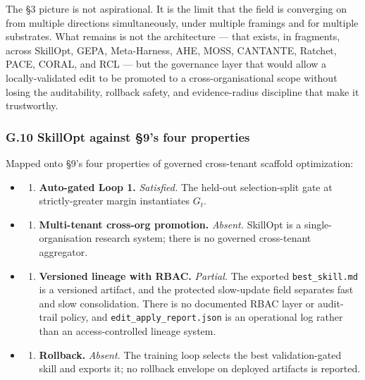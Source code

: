 The §3 picture is not aspirational. It is the limit that the field is
converging on from multiple directions simultaneously, under multiple
framings and for multiple substrates. What remains is not the
architecture --- that exists, in fragments, across SkillOpt, GEPA,
Meta-Harness, AHE, MOSS, CANTANTE, Ratchet, PACE, CORAL, and RCL --- but
the governance layer that would allow a locally-validated edit to be
promoted to a cross-organisational scope without losing the
auditability, rollback safety, and evidence-radius discipline that make
it trustworthy.

\subsubsection{G.10 SkillOpt against §9's four
properties}\label{g.10-skillopt-against-9s-four-properties}

Mapped onto §9's four properties of governed cross-tenant scaffold
optimization:

\begin{itemize}
\tightlist
\item
  \begin{enumerate}
  \def\labelenumi{(\alph{enumi})}
  \tightlist
  \item
    \textbf{Auto-gated Loop 1.} \emph{Satisfied.} The held-out
    selection-split gate at strictly-greater margin instantiates
    \(G_t\).
  \end{enumerate}
\item
  \begin{enumerate}
  \def\labelenumi{(\alph{enumi})}
  \setcounter{enumi}{1}
  \tightlist
  \item
    \textbf{Multi-tenant cross-org promotion.} \emph{Absent.} SkillOpt
    is a single-organisation research system; there is no governed
    cross-tenant aggregator.
  \end{enumerate}
\item
  \begin{enumerate}
  \def\labelenumi{(\alph{enumi})}
  \setcounter{enumi}{2}
  \tightlist
  \item
    \textbf{Versioned lineage with RBAC.} \emph{Partial.} The exported
    \texttt{best\_skill.md} is a versioned artifact, and the protected
    slow-update field separates fast and slow consolidation. There is no
    documented RBAC layer or audit-trail policy, and
    \texttt{edit\_apply\_report.json} is an operational log rather than
    an access-controlled lineage system.
  \end{enumerate}
\item
  \begin{enumerate}
  \def\labelenumi{(\alph{enumi})}
  \setcounter{enumi}{3}
  \tightlist
  \item
    \textbf{Rollback.} \emph{Absent.} The training loop selects the best
    validation-gated skill and exports it; no rollback envelope on
    deployed artifacts is reported.
  \end{enumerate}
\end{itemize}

